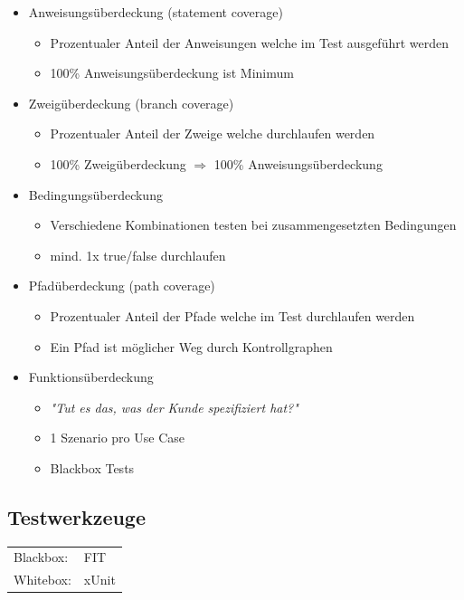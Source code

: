 \begin{itemize}
	\item Anweisungsüberdeckung (statement coverage)
			\begin{itemize}
				\item Prozentualer Anteil der Anweisungen welche im Test ausgeführt werden
				\item 100\% Anweisungsüberdeckung ist Minimum
			\end{itemize}
	\item Zweigüberdeckung (branch coverage)
			\begin{itemize}
				\item Prozentualer Anteil der Zweige welche durchlaufen werden
				\item 100\% Zweigüberdeckung $\Rightarrow$ 100\% Anweisungsüberdeckung
			\end{itemize}
	\item Bedingungsüberdeckung
			\begin{itemize}
				\item Verschiedene Kombinationen testen bei zusammengesetzten Bedingungen
				\item mind. 1x true/false durchlaufen
			\end{itemize}
	\item Pfadüberdeckung (path coverage)
			\begin{itemize}
				\item Prozentualer Anteil der Pfade welche im Test durchlaufen werden
				\item Ein Pfad ist möglicher Weg durch Kontrollgraphen
			\end{itemize}
	\item Funktionsüberdeckung
			\begin{itemize}
				\item \textit{"{}Tut es das, was der Kunde spezifiziert hat?"}
				\item 1 Szenario pro Use Case 
				\item Blackbox Tests
			\end{itemize}
\end{itemize}

\subsection{Testwerkzeuge}
\begin{tabular}{ll}
	Blackbox: & FIT \\
	Whitebox: & xUnit
\end{tabular}


